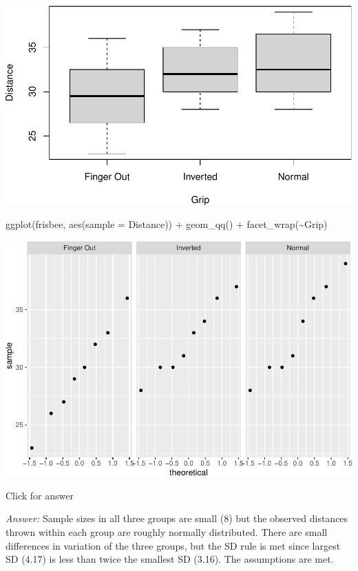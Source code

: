 \documentclass[
]{book}
\newenvironment{Shaded}{\begin{snugshade}}{\end{snugshade}}
\newcommand{\AttributeTok}[1]{\textcolor[rgb]{0.77,0.63,0.00}{#1}}
\newcommand{\FunctionTok}[1]{\textcolor[rgb]{0.00,0.00,0.00}{#1}}
\newcommand{\NormalTok}[1]{#1}
\newcommand{\SpecialCharTok}[1]{\textcolor[rgb]{0.00,0.00,0.00}{#1}}
\begin{document}
\includegraphics[width=1\linewidth]{Class_Activity_23_files/figure-latex/unnamed-chunk-3-1}

\begin{Shaded}
\begin{Highlighting}[]
\FunctionTok{ggplot}\NormalTok{(frisbee, }\FunctionTok{aes}\NormalTok{(}\AttributeTok{sample =}\NormalTok{ Distance)) }\SpecialCharTok{+} \FunctionTok{geom\_qq}\NormalTok{() }\SpecialCharTok{+} \FunctionTok{facet\_wrap}\NormalTok{(}\SpecialCharTok{\textasciitilde{}}\NormalTok{Grip)}
\end{Highlighting}
\end{Shaded}

\includegraphics[width=1\linewidth]{Class_Activity_23_files/figure-latex/unnamed-chunk-3-2}

Click for answer

\emph{Answer:} Sample sizes in all three groups are small (8) but the observed distances thrown within each group are roughly normally distributed. There are small differences in variation of the three groups, but the SD rule is met since largest SD (4.17) is less than twice the smallest SD (3.16). The assumptions are met.
\end{document}
